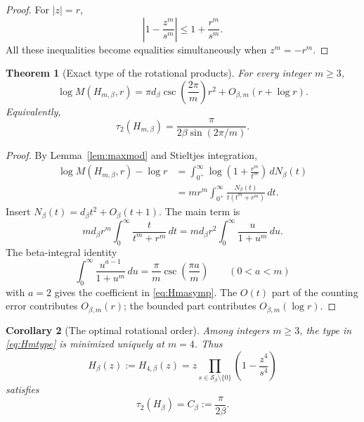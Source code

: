 \documentclass[11pt,oneside]{article}
\newtheorem{theorem}{Theorem}[section]
\newtheorem{corollary}[theorem]{Corollary}
\theoremstyle{definition}
\theoremstyle{remark}
\newcommand{\Sbeta}{\mathcal S_\beta}
\newcommand{\Cbeta}{C_\beta}
\begin{document}
\begin{proof}
For $|z|=r$,
\[
 \left|1-\frac{z^m}{s^m}\right|
 \le1+\frac{r^m}{s^m}.
\]
All these inequalities become equalities simultaneously when $z^m=-r^m$.
\end{proof}

\begin{theorem}[Exact type of the rotational products]
\label{thm:Hmtype}
For every integer $m\ge3$,
\begin{equation}
 \log M(H_{m,\beta},r)
 =\pi d_\beta\csc\left(\frac{2\pi}{m}\right)r^2
   +O_{\beta,m}(r+\log r).
 \label{eq:Hmasymp}
\end{equation}
Equivalently,
\begin{equation}
 \tau_2(H_{m,\beta})
 =\frac{\pi}{2\beta\sin(2\pi/m)}.
 \label{eq:Hmtype}
\end{equation}
\end{theorem}

\begin{proof}
By Lemma~\ref{lem:maxmod} and Stieltjes integration,
\[
 \begin{aligned}
 \log M(H_{m,\beta},r)-\log r
 &=\int_{0^+}^{\infty}\log\left(1+\frac{r^m}{t^m}\right)\,dN_\beta(t)\\
 &=m r^m\int_{0^+}^{\infty}
       \frac{N_\beta(t)}{t(t^m+r^m)}\,dt.
 \end{aligned}
\]
Insert $N_\beta(t)=d_\beta t^2+O_\beta(t+1)$.  The main term is
\[
 m d_\beta r^m\int_0^\infty\frac{t}{t^m+r^m}\,dt
 =m d_\beta r^2\int_0^\infty\frac{u}{1+u^m}\,du.
\]
The beta-integral identity
\[
 \int_0^\infty\frac{u^{a-1}}{1+u^m}\,du
 =\frac{\pi}{m}\csc\left(\frac{\pi a}{m}\right)
 \qquad(0<a<m)
\]
with $a=2$ gives the coefficient in \eqref{eq:Hmasymp}.  The $O(t)$ part of the counting
error contributes $O_{\beta,m}(r)$; the bounded part contributes $O_{\beta,m}(\log r)$.
\end{proof}

\begin{corollary}[The optimal rotational order]
\label{cor:m4}
Among integers $m\ge3$, the type in \eqref{eq:Hmtype} is minimized uniquely at $m=4$.
Thus
\begin{equation}
 H_\beta(z):=H_{4,\beta}(z)
 =z\prod_{s\in\Sbeta\setminus\{0\}}
       \left(1-\frac{z^4}{s^4}\right)
 \label{eq:H4}
\end{equation}
satisfies
\begin{equation}
 \tau_2(H_\beta)=\Cbeta:=\frac{\pi}{2\beta}.
 \label{eq:Cbeta}
\end{equation}
\end{corollary}
\end{document}
